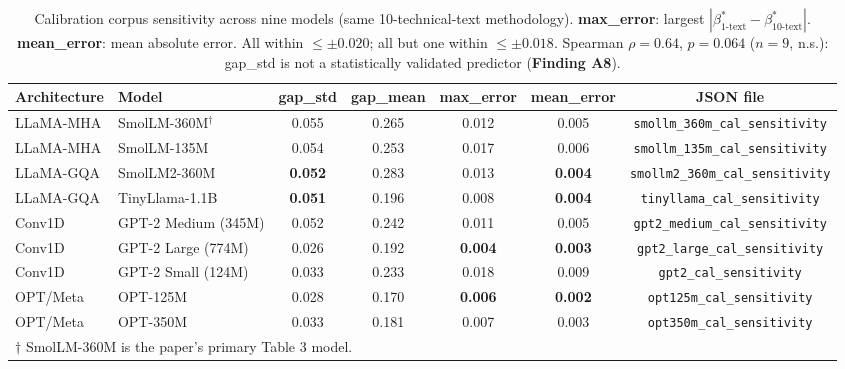 \documentclass{article}
\begin{document}
\begin{table}[h]
\centering
\caption{Calibration corpus sensitivity across nine models (same 10-technical-text methodology). \textbf{max\_error}: largest $|\beta^*_\text{1-text} - \beta^*_\text{10-text}|$. \textbf{mean\_error}: mean absolute error. All within $\leq\pm0.020$; all but one within $\leq\pm0.018$. Spearman $\rho=0.64$, $p=0.064$ ($n=9$, n.s.): gap\_std is not a statistically validated predictor (\textbf{Finding A8}).}
\begin{tabular}{llccccc}
\toprule
Architecture & Model & gap\_std & gap\_mean & max\_error & mean\_error & JSON file \\
\midrule
LLaMA-MHA & SmolLM-360M$^\dagger$ & 0.055 & 0.265 & 0.012 & 0.005 & \texttt{smollm\_360m\_cal\_sensitivity} \\
LLaMA-MHA & SmolLM-135M & 0.054 & 0.253 & 0.017 & 0.006 & \texttt{smollm\_135m\_cal\_sensitivity} \\
LLaMA-GQA & SmolLM2-360M & \textbf{0.052} & 0.283 & 0.013 & \textbf{0.004} & \texttt{smollm2\_360m\_cal\_sensitivity} \\
LLaMA-GQA & TinyLlama-1.1B & \textbf{0.051} & 0.196 & 0.008 & \textbf{0.004} & \texttt{tinyllama\_cal\_sensitivity} \\
Conv1D & GPT-2 Medium (345M) & 0.052 & 0.242 & 0.011 & 0.005 & \texttt{gpt2\_medium\_cal\_sensitivity} \\
Conv1D & GPT-2 Large (774M) & 0.026 & 0.192 & \textbf{0.004} & \textbf{0.003} & \texttt{gpt2\_large\_cal\_sensitivity} \\
Conv1D & GPT-2 Small (124M) & 0.033 & 0.233 & 0.018 & 0.009 & \texttt{gpt2\_cal\_sensitivity} \\
OPT/Meta & OPT-125M & 0.028 & 0.170 & \textbf{0.006} & \textbf{0.002} & \texttt{opt125m\_cal\_sensitivity} \\
OPT/Meta & OPT-350M & 0.033 & 0.181 & 0.007 & 0.003 & \texttt{opt350m\_cal\_sensitivity} \\
\bottomrule
\multicolumn{7}{l}{\footnotesize $\dagger$ SmolLM-360M is the paper's primary Table 3 model.} \\
\end{tabular}
\label{tab:sensitivity_full}
\end{table}
\end{document}
